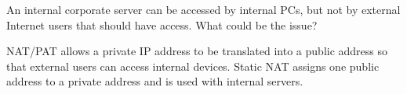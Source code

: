 \begin{example}
An internal corporate server can be accessed by internal PCs, but not by external Internet users that should have access. What could be the issue?
\end{example}

\begin{solution}
NAT/PAT allows a private IP address to be translated into a public address so that external users can access internal devices. Static NAT assigns one public address to a private address and is used with internal servers.
\end{solution}

\begin{example}

\end{example}
